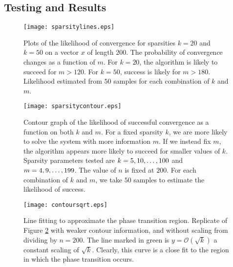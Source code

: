 \documentclass{article}
\begin{document}

\subsection{Testing and Results}

\begin{figure}
    \centering
    \texttt{[image: sparsitylines.eps]}
    \caption{
        Plots of the likelihood of convergence for sparsities $k = 20$ and $k=50$ on a vector $x$  of length $200$.
        The probability of convergence changes as a function of $m$.
        For $k=20$, the algorithm is likely to succeed for $m>120$.
        For $k=50$, success is likely for $m>180$.
        Likelihood estimated from $50$ samples for each combination of $k$ and $m$.
    }
    \label{fig:sparsitylines}
\end{figure}

\begin{figure}
    \centering
    \texttt{[image: sparsitycontour.eps]}
    \caption{
        Contour graph of the likelihood of successful convergence as a function on both $k$ and $m$.
        For a fixed sparsity $k$, we are more likely to solve the system with more information $m$.
        If we instead fix $m$, the algorithm appears more likely to succeed for smaller values of $k$. 
        Sparsity parameters tested are $k = 5, 10, \mathellipsis, 100$ and $m = 4, 9, \mathellipsis, 199$.
        The value of $n$ is fixed at $200$.
        For each combination of $k$ and $m$, we take $50$ samples to estimate the likelihood of success.
    }
    \label{fig:sparsitycontour}
\end{figure}

\begin{figure}
    \centering
    \texttt{[image: contoursqrt.eps]}
    \caption{
        Line fitting to approximate the phase transition region.
        Replicate of Figure \ref{fig:sparsitycontour} with weaker contour information,
        and without scaling from dividing by $n=200$. 
        The line marked in green is $y = \mathcal{O}(\sqrt{k})$ a constant scaling of $\sqrt{k}$.
        Clearly, this curve is a close fit to the region in which the phase transition occurs.
    }
    \label{fig:bestfit}
\end{figure}
\end{document}
